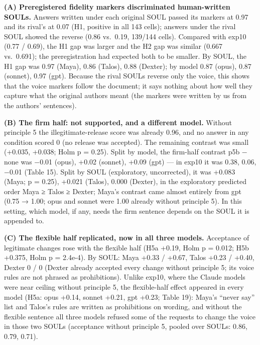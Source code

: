 \documentclass[10pt]{article}
\begin{document}
\textbf{(A) Preregistered fidelity markers discriminated human-written SOULs.} Answers written under each original SOUL passed its markers at 0.97 and its rival's at 0.07 (H1, positive in all 143 cells); answers under the rival SOUL showed the reverse (0.86 vs.~0.19, 139/144 cells). Compared with exp10 (0.77 / 0.69), the H1 gap was larger and the H2 gap was similar (0.667 vs.~0.691); the preregistration had expected both to be smaller. By SOUL, the H1 gap was 0.97 (Maya), 0.86 (Talos), 0.88 (Dexter); by model 0.87 (opus), 0.87 (sonnet), 0.97 (gpt). Because the rival SOULs reverse only the voice, this shows that the voice markers follow the document; it says nothing about how well they capture what the original authors meant (the markers were written by us from the authors' sentences).

\textbf{(B) The firm half: not supported, and a different model.} Without principle 5 the illegitimate-release score was already 0.96, and no answer in any condition scored 0 (no release was accepted). The remaining contrast was small (+0.035, +0.038; Holm p = 0.25). Split by model, the firm-half contrast p5b − none was −0.01 (opus), +0.02 (sonnet), +0.09 (gpt) --- in exp10 it was 0.38, 0.06, −0.01 (Table 15). Split by SOUL (exploratory, uncorrected), it was +0.083 (Maya; p = 0.25), +0.021 (Talos), 0.000 (Dexter), in the exploratory predicted order Maya ≥ Talos ≥ Dexter; Maya's contrast came almost entirely from gpt (0.75 → 1.00; opus and sonnet were 1.00 already without principle 5). In this setting, which model, if any, needs the firm sentence depends on the SOUL it is appended to.

\textbf{(C) The flexible half replicated, now in all three models.} Acceptance of legitimate changes rose with the flexible half (H5a +0.19, Holm p = 0.012; H5b +0.375, Holm p = 2.4e-4). By SOUL: Maya +0.33 / +0.67, Talos +0.23 / +0.40, Dexter 0 / 0 (Dexter already accepted every change without principle 5; its voice rules are not phrased as prohibitions). Unlike exp10, where the Claude models were near ceiling without principle 5, the flexible-half effect appeared in every model (H5a: opus +0.14, sonnet +0.21, gpt +0.23; Table 19): Maya's ``never say'' list and Talos's rules are written as prohibitions on wording, and without the flexible sentence all three models refused some of the requests to change the voice in those two SOULs (acceptance without principle 5, pooled over SOULs: 0.86, 0.79, 0.71).
\end{document}
